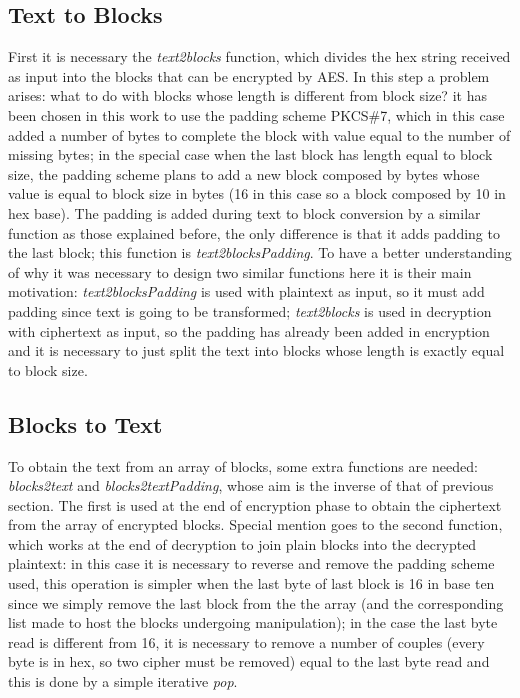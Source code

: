 \documentclass{article}
\begin{document}
\subsection{Text to Blocks}

First it is necessary the \textit{text2blocks} function, which divides the hex string received as input into the blocks that can be encrypted by AES. In this step a problem arises: what to do with blocks whose length is different from block size? it has been chosen in this work to use the padding scheme PKCS\#7, which in this case added a number of bytes to complete the block with value equal to the number of missing bytes; in the special case when the last block has length equal to block size, the padding scheme plans to add a new block composed by bytes whose value is equal to block size in bytes (16 in this case so a block composed by 10 in hex base). The padding is added during text to block conversion by a similar function as those explained before, the only difference is that it adds padding to the last block; this function is \textit{text2blocksPadding}. To have a better understanding of why it was necessary to design two similar functions here it is their main motivation: \textit{text2blocksPadding} is used with plaintext as input, so it must add padding since text is going to be transformed; \textit{text2blocks} is used in decryption with ciphertext as input, so the padding has already been added in encryption and it is necessary to just split the text into blocks whose length is exactly equal to block size.

\subsection{Blocks to Text}

To obtain the text from an array of blocks, some extra functions are needed: \textit{blocks2text} and \textit{blocks2textPadding}, whose aim is the inverse of that of previous section. The first is used at the end of encryption phase to obtain the ciphertext from the array of encrypted blocks. Special mention goes to the second function, which works at the end of decryption to join plain blocks into the decrypted plaintext: in this case it is necessary to reverse and remove the padding scheme used, this operation is simpler when the last byte of last block is 16 in base ten since we simply remove the last block from the the array (and the corresponding list made to host the blocks undergoing manipulation); in the case the last byte read is different from 16, it is necessary to remove a number of couples (every byte is in hex, so two cipher must be removed) equal to the last byte read and this is done by a simple iterative \textit{pop}. 
\end{document}
